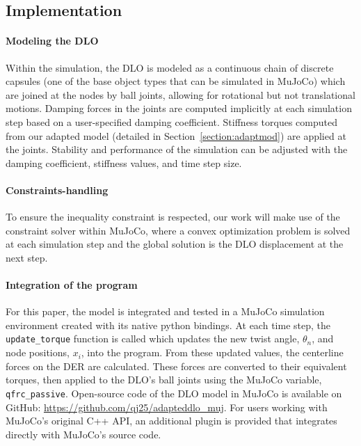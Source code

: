 \documentclass[letterpaper, 10 pt, conference]{ieeeconf}  %
\begin{document}
\subsection{Implementation}

\paragraph{Modeling the DLO}
Within the simulation, the DLO is modeled as a continuous chain of discrete capsules (one of the base object types that can be simulated in MuJoCo) which are joined at the nodes by ball joints, allowing for rotational but not translational motions. Damping forces in the joints are computed implicitly at each simulation step based on a user-specified damping coefficient. Stiffness torques computed from our adapted model (detailed in Section~\ref{section:adaptmod}) are applied at the joints. Stability and performance of the simulation can be adjusted with the damping coefficient, stiffness values, and time step size.

\paragraph{Constraints-handling}
To ensure the inequality constraint is respected, our work will make use of the constraint solver within MuJoCo, where a convex optimization problem is solved at each simulation step and the global solution is the DLO displacement at the next step.

\paragraph{Integration of the program}
For this paper, the model is integrated and tested in a MuJoCo simulation environment created with its native python bindings. At each time step, the \verb!update_torque! function is called which updates the new twist angle, $\theta_n$, and node positions, $x_i$, into the program. From these updated values, the centerline forces on the DER are calculated. These forces are converted to their equivalent torques, then applied to the DLO's ball joints using the MuJoCo variable, \verb!qfrc_passive!. Open-source code of the DLO model in MuJoCo is available on GitHub: \url{https://github.com/qj25/adapteddlo_muj}. For users working with MuJoCo’s original C++ API, an additional plugin is provided that integrates directly with MuJoCo’s source code.
\end{document}
